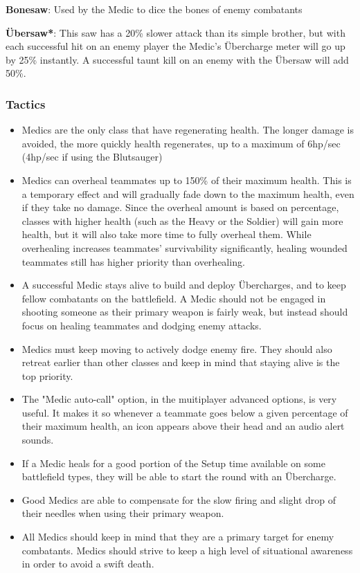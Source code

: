 {\bf Bonesaw}: Used by the Medic to dice the bones of enemy combatants

{\bf Übersaw*}: This saw has a 20\% slower attack than its simple brother, but with each successful hit on an enemy player the Medic's Übercharge meter will go up by 25\% instantly. A successful taunt kill on an enemy with the Übersaw will add 50\%.

\subsubsection {Tactics}
\begin {itemize}
\item Medics are the only class that have regenerating health. The longer damage is avoided, the more quickly health regenerates, up to a maximum of 6hp/sec (4hp/sec if using the Blutsauger)

\item Medics can overheal teammates up to 150\% of their maximum health. This is a temporary effect and will gradually fade down to the maximum health, even if they take no damage. Since the overheal amount is based on percentage, classes with higher health (such as the Heavy or the Soldier) will gain more health, but it will also take more time to fully overheal them. While overhealing increases teammates' survivability significantly, healing wounded teammates still has higher priority than overhealing.

\item A successful Medic stays alive to build and deploy Übercharges, and to keep fellow combatants on the battlefield. A Medic should not be engaged in shooting someone as their primary weapon is fairly weak, but instead should focus on healing teammates and dodging enemy attacks.

\item Medics must keep moving to actively dodge enemy fire. They should also retreat earlier than other classes and keep in mind that staying alive is the top priority.

\item The "Medic auto-call" option, in the muitiplayer advanced options, is very useful. It makes it so whenever a teammate goes below a given percentage of their maximum health, an icon appears above their head and an audio alert sounds.

\item If a Medic heals for a good portion of the Setup time available on some battlefield types, they will be able to start the round with an Übercharge.

\item Good Medics are able to compensate for the slow firing and slight drop of their needles when using their primary weapon.

\item All Medics should keep in mind that they are a primary target for enemy combatants. Medics should strive to keep a high level of situational awareness in order to avoid a swift death.
\end {itemize}
